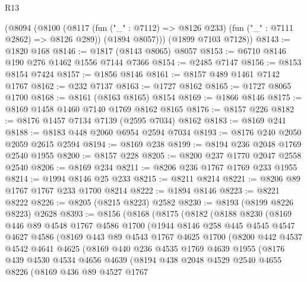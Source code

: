 \begin{lexlean}{R13}
\begin{coremodule}
      (@8094
        (@8100
          (@8117 (fun ("_" : @7112) => @8126 @233) (fun ("_" : @7111 @2862) => @8126 @289))
          (@1894 @8057)))
      (@1899 @7103 @7128))
@8143 := @1820 @168
@8146 := @1817 (@8143 @8065) @8057
@8153 := @6710 @8146 @190 @276 @1462 @1556 @7144 @7366
@8154 := @2485 @7147
@8156 := @8153 @8154 @7424
@8157 := @1856 @8146
@8161 := @8157 @489 @1461 @7142 @1767
@8162 := @232 @7137
@8163 := @1727 @8162
@8165 := @1727 @8065 @1700
@8168 := @8161 (@8163 @8165) @8154
@8169 := @1866 @8146
@8175 := @8169 @1458 @1460 @7140 @1769 @8162 @8165
@8176 := @8157 @226
@8182 := @8176 @1457 @7134 @7139 (@2595 @7034) @8162
@8183 := @8169 @241
@8188 := @8183 @448 @2060 @6954 @2594 @7034
@8193 := @8176 @240 @2050 @2059 @2615 @2594
@8194 := @8169 @238
@8199 := @8194 @236 @2048 @1769 @2540 @1955
@8200 := @8157 @228
@8205 := @8200 @237 @1770 @2047 @2558 @2540
@8206 := @8169 @234
@8211 := @8206 @236 @1767 @1769 @233 @1955
@8214 := @1994 @8146 @25 @233
@8215 := @8211 @8214
@8221 := @8206 @89 @1767 @1767 @233 @1700 @8214
@8222 := @1894 @8146
@8223 := @8221 @8222
@8226 := @8205 (@8215 @8223) @2582
@8230 := @8193 (@8199 @8226 @8223) @2628
@8393 := @8156
    (@8168
      (@8175
        (@8182
          (@8188
            @8230
            (@8169
              @446
              @89
              @4548
              @1767
              @4586
              @1700
              (@1944
                @8146
                @258
                @445
                @4545
                @4547
                @4627
                @4586
                (@8169
                  @443
                  @89
                  @4543
                  @1767
                  @4625
                  @1700
                  (@8200
                    @442
                    @4537
                    @4542
                    @4641
                    @4625
                    (@8169
                      @440
                      @236
                      @4535
                      @1769
                      @4639
                      @1955
                      (@8176
                        @439
                        @4530
                        @4534
                        @4656
                        @4639
                        (@8194
                          @438
                          @2048
                          @4529
                          @2540
                          @4655
                          @8226
                          (@8169
                            @436
                            @89
                            @4527
                            @1767

\end{coremodule}
\end{lexlean}
